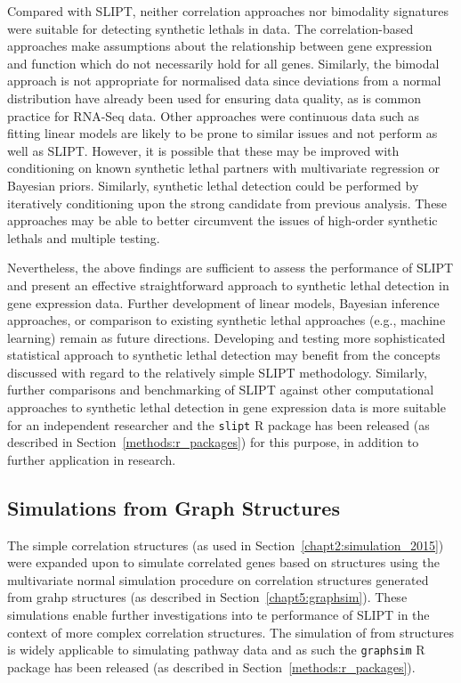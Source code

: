 Compared with \gls{SLIPT}, neither correlation approaches nor bimodality signatures were suitable for detecting \glspl{synthetic lethal} in  data. The correlation-based approaches make assumptions about the relationship between \gls{gene expression} and function which do not necessarily hold for all genes. Similarly, the bimodal approach is not appropriate for normalised data since deviations from a normal distribution have already been used for ensuring data quality, as is common practice for \gls{RNA-Seq} data. Other approaches were continuous data such as fitting linear models are likely to be prone to similar issues and not perform as well as \gls{SLIPT}. However, it is possible that these may be improved with conditioning on known \gls{synthetic lethal} partners with multivariate regression or Bayesian priors. Similarly, \gls{synthetic lethal} detection could be performed by iteratively conditioning upon the strong candidate from previous analysis. These approaches may be able to better circumvent the issues of high-order \glspl{synthetic lethal} and multiple testing. 

Nevertheless, the above findings are sufficient to assess the performance of \gls{SLIPT} and present an effective straightforward approach to \gls{synthetic lethal} detection in \gls{gene expression} data. Further development of linear models, Bayesian inference approaches, or comparison to existing \gls{synthetic lethal} approaches (e.g., machine learning) remain as future directions. Developing and testing more sophisticated statistical approach to \gls{synthetic lethal} detection may benefit from the concepts discussed with regard to the relatively simple \gls{SLIPT} methodology. Similarly, further comparisons and benchmarking of \gls{SLIPT} against other computational approaches to \gls{synthetic lethal} detection in \gls{gene expression} data is more suitable for an independent researcher and the \texttt{slipt} R package has been released (as described in Section~\ref{methods:r_packages}) for this purpose, in addition to further application in research.


\subsection{Simulations from Graph Structures}

The simple correlation structures (as used in Section~\ref{chapt2:simulation_2015}) were expanded upon to simulate correlated genes based on  structures using the multivariate normal simulation procedure on correlation structures generated from grahp structures (as described in Section~\ref{chapt5:graphsim}). These simulations enable further investigations into te performance of \gls{SLIPT} in the context of more complex correlation structures. The simulation of  from  structures is widely applicable to simulating pathway  data and as such the \texttt{graphsim} R package has been released (as described in Section~\ref{methods:r_packages}).

